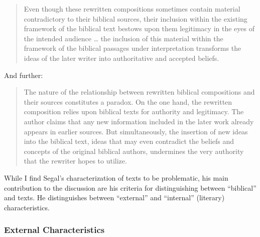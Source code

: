 \begin{quote}
    Even though these rewritten compositions sometimes contain material contradictory to their biblical sources, their inclusion within the existing framework of the biblical text bestows upon them legitimacy in the eyes of the intended audience \ldots{} the inclusion of this material within the framework of the biblical passages under interpretation transforms the ideas of the later writer into authoritative and accepted beliefs.%
        \autocite[11]{segal_henze2005}
\end{quote} 
\noindent
And further: 
\begin{quote}
    The nature of the relationship between rewritten biblical compositions and their sources constitutes a paradox. On the one hand, the rewritten composition relies upon biblical texts for authority and legitimacy. The author claims that any new information included in the later work already appears in earlier sources. But simultaneously, the insertion of new ideas into the biblical text, ideas that may even contradict the beliefs and concepts of the original biblical authors, undermines the very authority that the rewriter hopes to utilize.%
    \autocite[11-12]{segal_henze2005}
\end{quote} 
\noindent
While I find Segal's characterization of \rwb texts to be problematic, his main contribution to the discussion are his criteria for distinguishing between ``biblical'' and \rwb texts. He distinguishes between ``external'' and ``internal'' (literary) characteristics. 

\subsubsection{External Characteristics}

